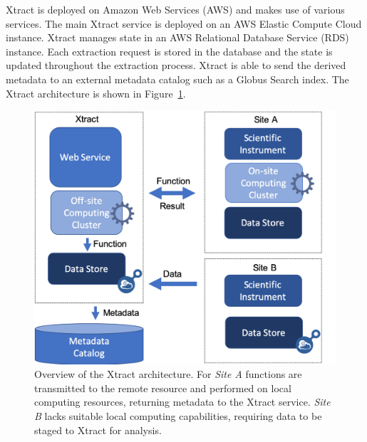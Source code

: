 \documentclass[sigconf]{acmart}
\newcommand{\name}{Xtract}
\begin{document}

\name{} is deployed on Amazon Web Services (AWS) and makes use
of various services. The main \name{} service
is deployed on an AWS Elastic Compute Cloud instance.
\name{} manages state in an AWS Relational Database Service (RDS)
instance. Each extraction request is stored in the database
and the state is updated throughout the extraction process. 
\name{} is able to send the derived metadata to an external
metadata catalog such as a Globus Search index.
The \name{} architecture is shown in Figure~\ref{fig:arch}.

\begin{figure}[t]
	\centering
	\includegraphics[scale=0.3]{figs/new-arch.png}
	\caption{Overview of the \name{} architecture. For \textit{Site A} functions are transmitted to the remote resource and performed on local computing resources, returning metadata to the \name{} service. \textit{Site B} lacks suitable local
	computing capabilities, requiring data to be staged to \name{} for analysis.}
	\label{fig:arch}
\end{figure}
\end{document}
